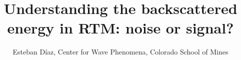 

\author{Esteban D\'{i}az, 
Center for Wave Phenomena, 
Colorado School of Mines}
\title{Understanding the backscattered energy in RTM: noise or signal?}
\maketitle








\newpage


